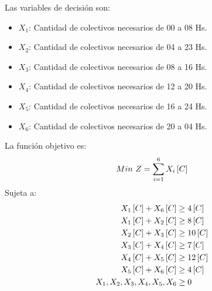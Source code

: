 \documentclass{tarea}
\begin{document}
\begin{homeworkProblem}
Las variables de decisión son:
\begin{itemize}
	\item $X_1$: Cantidad de colectivos necesarios de 00 a 08 Hs.
	\item $X_2$: Cantidad de colectivos necesarios de 04 a 23 Hs.
	\item $X_3$: Cantidad de colectivos necesarios de 08 a 16 Hs.
	\item $X_4$: Cantidad de colectivos necesarios de 12 a 20 Hs.
	\item $X_5$: Cantidad de colectivos necesarios de 16 a 24 Hs.
	\item $X_6$: Cantidad de colectivos necesarios de 20 a 04 Hs.
\end{itemize}
La función objetivo es: 
\begin{equation}
	Min\ Z = \sum_{i=1}^{6}{X_i}\left[ C \right]
\end{equation}
Sujeta a:
\begin{align*}
	X_1\left[ C \right] + X_6\left[ C \right] &\ge 4\left[ C \right] \\
	X_1\left[ C \right] +X_2\left[ C \right] &\ge 8\left[ C \right] \\
	X_2\left[ C \right] +X_3\left[ C \right] &\ge 10\left[ C \right] \\
	X_3\left[ C \right] + X_4\left[ C \right] &\ge 7\left[ C \right] \\
	X_4\left[ C \right] + X_5\left[ C \right] &\ge 12\left[ C \right] \\
	X_5\left[ C \right] + X_6\left[ C \right] &\ge 4\left[ C \right]\\
	X_1,X_2,X_3,X_4,X_5,X_6 &\ge 0
\end{align*}
\end{homeworkProblem}
\end{document}
